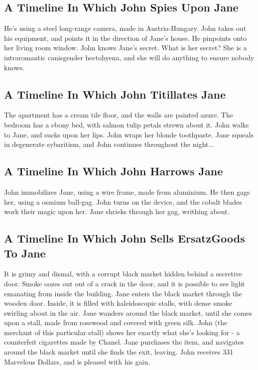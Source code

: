 \documentclass{article}
\begin{document}
\subsection{A Timeline In Which John Spies Upon Jane}


He's using a steel long{-}range camera, made in Austria{-}Hungary.
John takes out his equipment, and points it in the direction of Jane's house. He pinpoints onto her living room window.
John knows Jane's secret. What is her secret? She is a intraromantic canisgender hectohyena, and she will do anything to ensure nobody knows.
\subsection{A Timeline In Which John Titillates Jane}


The apartment has a cream tile floor, and the walls are painted azure.
The bedroom has a ebony bed, with salmon tulip petals strewn about it.
John walks to Jane, and sucks upon her lips.
John wraps her blonde toothpaste.
Jane squeals in degenerate sybaritism, and John continues throughout the night...
\subsection{A Timeline In Which John Harrows Jane}


John immobilizes Jane, using a wire frame, made from aluminium.
He then gags her, using a osmium ball{-}gag.
John turns on the device, and the cobalt blades work their magic upon her.
Jane shrieks through her gag, writhing about.
\subsection{A Timeline In Which John Sells ErsatzGoods To Jane}


It is grimy and dismal, with a corrupt black market hidden behind a secretive door.
Smoke oozes out out of a crack in the door, and it is possible to see light emanating from inside the building.
Jane enters the black market through the wooden door.
Inside, it is filled with kaleidoscopic stalls, with dense smoke swirling about in the air.
Jane wanders around the black market, until she comes upon a stall, made from rosewood and covered with green silk.
John (the merchant of this particular stall) shows her exactly what she's looking for {-} a counterfeit cigarettes made by Chanel.
Jane purchases the item, and navigates around the black market until she finds the exit, leaving.
John receives 331 Marvelous Dollars, and is pleased with his gain.
\end{document}
